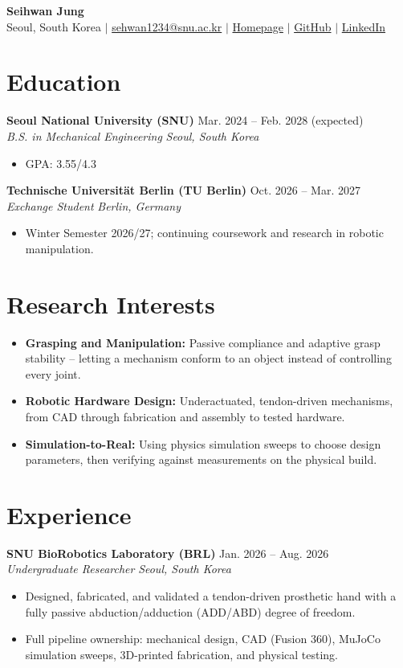 \documentclass[10.5pt,a4paper]{article}
\newcommand{\heading}[4]{%
  \textbf{#1} \hfill #2\\
  \textit{#3} \hfill \textit{#4}\\[1pt]
}
\begin{document}
\begin{center}
  {\Huge \textbf{Seihwan Jung}}\\[6pt]
  Seoul, South Korea \quad $\vert$ \quad
  \href{mailto:sehwan1234@snu.ac.kr}{sehwan1234@snu.ac.kr} \quad $\vert$ \quad
  \href{https://seihwan-jung.github.io/}{Homepage} \quad $\vert$ \quad
  \href{https://github.com/seihwan-Jung}{GitHub} \quad $\vert$ \quad
  \href{https://www.linkedin.com/in/seihwan-jung-aa06a2433/}{LinkedIn}
\end{center}
\section*{Education}
\heading{Seoul National University (SNU)}{Mar. 2024 -- Feb. 2028 (expected)}{B.S. in Mechanical Engineering}{Seoul, South Korea}
\begin{itemize}
  \item GPA: 3.55/4.3
\end{itemize}
\heading{Technische Universit\"at Berlin (TU Berlin)}{Oct. 2026 -- Mar. 2027}{Exchange Student}{Berlin, Germany}
\begin{itemize}
  \item Winter Semester 2026/27; continuing coursework and research in robotic manipulation.
\end{itemize}
\section*{Research Interests}
\begin{itemize}
  \item \textbf{Grasping and Manipulation:} Passive compliance and adaptive grasp stability -- letting a mechanism conform to an object instead of controlling every joint.
  \item \textbf{Robotic Hardware Design:} Underactuated, tendon-driven mechanisms, from CAD through fabrication and assembly to tested hardware.
  \item \textbf{Simulation-to-Real:} Using physics simulation sweeps to choose design parameters, then verifying against measurements on the physical build.
\end{itemize}
\section*{Experience}
\heading{SNU BioRobotics Laboratory (BRL)}{Jan. 2026 -- Aug. 2026}{Undergraduate Researcher}{Seoul, South Korea}
\begin{itemize}
  \item Designed, fabricated, and validated a tendon-driven prosthetic hand with a fully passive abduction/adduction (ADD/ABD) degree of freedom.
  \item Full pipeline ownership: mechanical design, CAD (Fusion 360), MuJoCo simulation sweeps, 3D-printed fabrication, and physical testing.
\end{itemize}
\end{document}
